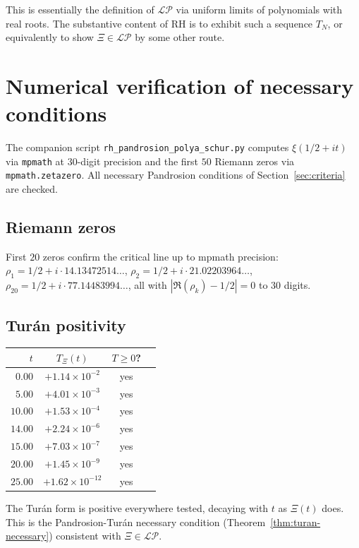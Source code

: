 \documentclass[11pt,a4paper]{article}
\begin{document}
\noindent This is essentially the definition of $\mathcal{LP}$ via uniform
limits of polynomials with real roots. The substantive content of RH is
to exhibit such a sequence $T_N$, or equivalently to show
$\Xi \in \mathcal{LP}$ by some other route.

\section{Numerical verification of necessary conditions}\label{sec:numerics}

The companion script \texttt{rh\_pandrosion\_polya\_schur.py} computes
$\xi(1/2 + it)$ via \texttt{mpmath} at $30$-digit precision and the first
$50$ Riemann zeros via \texttt{mpmath.zetazero}. All necessary Pandrosion
conditions of Section~\ref{sec:criteria} are checked.

\subsection{Riemann zeros}
First $20$ zeros confirm the critical line up to mpmath precision:
$\rho_1 = 1/2 + i \cdot 14.13472514\ldots$, $\rho_2 = 1/2 + i \cdot 21.02203964\ldots$,
$\rho_{20} = 1/2 + i \cdot 77.14483994\ldots$, all with $|\Re(\rho_k) - 1/2| = 0$
to $30$ digits.

\subsection{Tur\'an positivity}
\begin{center}
\begin{tabular}{rccc}
\toprule
$t$ & $T_\Xi(t)$ & $T \ge 0$? \\
\midrule
$0.00$  & $+1.14 \times 10^{-2}$  & yes \\
$5.00$  & $+4.01 \times 10^{-3}$  & yes \\
$10.00$ & $+1.53 \times 10^{-4}$  & yes \\
$14.00$ & $+2.24 \times 10^{-6}$  & yes \\
$15.00$ & $+7.03 \times 10^{-7}$  & yes \\
$20.00$ & $+1.45 \times 10^{-9}$  & yes \\
$25.00$ & $+1.62 \times 10^{-12}$ & yes \\
\bottomrule
\end{tabular}
\end{center}

The Tur\'an form is positive everywhere tested, decaying with $t$ as
$\Xi(t)$ does. This is the Pandrosion-Tur\'an necessary condition
(Theorem~\ref{thm:turan-necessary}) consistent with $\Xi \in \mathcal{LP}$.
\end{document}
